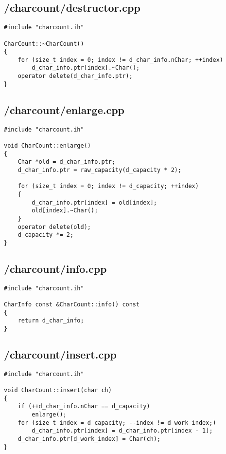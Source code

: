 \documentclass{article}
\begin{document}
\subsection*{/charcount/destructor.cpp}
\begin{verbatim}
#include "charcount.ih"

CharCount::~CharCount()
{
    for (size_t index = 0; index != d_char_info.nChar; ++index)
        d_char_info.ptr[index].~Char();
    operator delete(d_char_info.ptr);
}
\end{verbatim}
\subsection*{/charcount/enlarge.cpp}
\begin{verbatim}
#include "charcount.ih"

void CharCount::enlarge()
{
    Char *old = d_char_info.ptr;
    d_char_info.ptr = raw_capacity(d_capacity * 2);

    for (size_t index = 0; index != d_capacity; ++index)
    {
        d_char_info.ptr[index] = old[index];
        old[index].~Char();
    }
    operator delete(old);
    d_capacity *= 2;
}
\end{verbatim}
\subsection*{/charcount/info.cpp}
\begin{verbatim}
#include "charcount.ih"

CharInfo const &CharCount::info() const
{
    return d_char_info;
}
\end{verbatim}
\subsection*{/charcount/insert.cpp}
\begin{verbatim}
#include "charcount.ih"

void CharCount::insert(char ch)
{
    if (++d_char_info.nChar == d_capacity)
        enlarge();
    for (size_t index = d_capacity; --index != d_work_index;)
        d_char_info.ptr[index] = d_char_info.ptr[index - 1];
    d_char_info.ptr[d_work_index] = Char(ch);
}
\end{verbatim}
\end{document}
